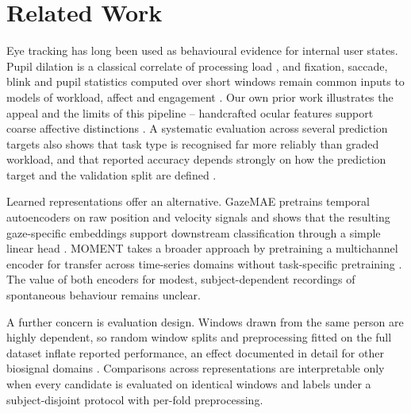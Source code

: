 \section{Related Work}

Eye tracking has long been used as behavioural evidence for internal user states.
Pupil dilation is a classical correlate of processing load \cite{kahneman1966pupil}, and fixation, saccade, blink and pupil statistics computed over short windows remain common inputs to models of workload, affect and engagement \cite{bixler2016mindwandering,fridman2018cognitive}.
Our own prior work illustrates the appeal and the limits of this pipeline -- handcrafted ocular features support coarse affective distinctions \cite{bozak2024emotion}.
A systematic evaluation across several prediction targets also shows that task type is recognised far more reliably than graded workload, and that reported accuracy depends strongly on how the prediction target and the validation split are defined \cite{bozak2026workload}.

Learned representations offer an alternative.
GazeMAE pretrains temporal autoencoders on raw position and velocity signals and shows that the resulting gaze-specific embeddings support downstream classification through a simple linear head \cite{bautista2020gazemae}.
MOMENT takes a broader approach by pretraining a multichannel encoder for transfer across time-series domains without task-specific pretraining \cite{goswami2024moment}.
The value of both encoders for modest, subject-dependent recordings of spontaneous behaviour remains unclear.

A further concern is evaluation design.
Windows drawn from the same person are highly dependent, so random window splits and preprocessing fitted on the full dataset inflate reported performance, an effect documented in detail for other biosignal domains \cite{rosenblatt2024leakage}.
Comparisons across representations are interpretable only when every candidate is evaluated on identical windows and labels under a subject-disjoint protocol with per-fold preprocessing.
